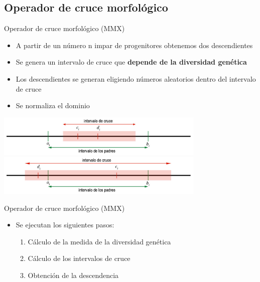 \documentclass[10pt]{beamer}
\begin{document}
\subsection{Operador de cruce morfológico}

\begin{frame}{Operador de cruce morfológico (MMX)}
	\begin{itemize}
		\item A partir de un número n impar de progenitores obtenemos dos descendientes
		\item Se genera un intervalo de cruce que \textbf{depende de la diversidad genética} 
		\item Los descendientes se generan eligiendo números aleatorios dentro del intervalo de cruce
		\item Se normaliza el dominio
	\end{itemize}
	
	\begin{center}
		\includegraphics[width=10cm]{crucemorfologico}
		\vspace{3mm}
		\includegraphics[width=10cm]{crucecombinado}
		
	\end{center}	
\end{frame}

\begin{frame}{Operador de cruce morfológico (MMX)}
	\begin{itemize}

		\item Se ejecutan los siguientes pasos:
		\begin{enumerate}
			\item Cálculo de la medida de la diversidad genética
			\item Cálculo de los intervalos de cruce
			\item Obtención de la descendencia
		\end{enumerate}
	\end{itemize}
	
\end{frame}
\end{document}
